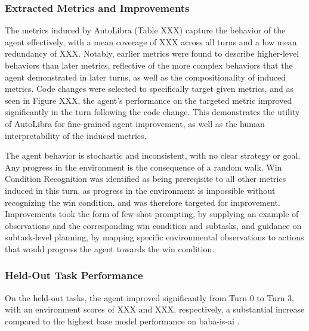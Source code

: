 \subsubsection{Extracted Metrics and Improvements}
The metrics induced by AutoLibra (Table XXX) capture the behavior of the agent effectively, with a mean coverage of XXX across all turns and a low mean redundancy of XXX. Notably, earlier metrics were found to describe higher-level behaviors than later metrics, reflective of the more complex behaviors that the agent demonstrated in later turns, as well as the compositionality of induced metrics. Code changes were selected to specifically target given metrics, and as seen in Figure XXX, the agent's performance on the targeted metric improved significantly in the turn following the code change. This demonstrates the utility of AutoLibra for fine-grained agent improvement, as well as the human interpretability of the induced metrics.

The agent behavior is stochastic and inconsistent, with no clear strategy or goal. Any progress in the environment is the consequence of a random walk. 
Win Condition Recognition was identified as being prereqisite to all other metrics induced in this turn, as progress in the environment is impossible without recognizing the win condition, and was therefore targeted for improvement. Improvements took the form of few-shot prompting, by supplying an example of observations and the corresponding win condition and subtasks, and guidance on subtask-level planning, by mapping specific environmental observations to actions that would progress the agent towards the win condition.


\subsubsection{Held-Out Task Performance}

On the held-out tasks, the agent improved significantly from Turn 0 to Turn 3, with an environment scores of XXX and XXX, respectively, a substantial increase compared to the highest base model performance on baba-is-ai \cite{paglieri2024balrog}. 


